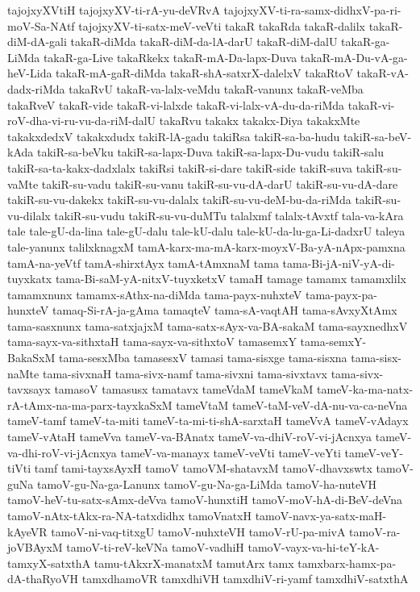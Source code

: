 {tajojxyXVtiH
tajojxyXV-ti-rA-yu-deVRvA
tajojxyXV-ti-ra-samx-didhxV-pa-ri-moV-Sa-NAtf
tajojxyXV-ti-satx-meV-veVti
takaR
takaRda
takaR-dalilx
takaR-diM-dA-gali
takaR-diMda
takaR-diM-da-lA-darU
takaR-diM-dalU
takaR-ga-LiMda
takaR-ga-Live
takaRkekx
takaR-mA-Da-lapx-Duva
takaR-mA-Du-vA-ga-heV-Lida
takaR-mA-gaR-diMda
takaR-shA-satxrX-dalelxV
takaRtoV
takaR-vA-dadx-riMda
takaRvU
takaR-va-lalx-veMdu
takaR-vanunx
takaR-veMba
takaRveV
takaR-vide
takaR-vi-lalxde
takaR-vi-lalx-vA-du-da-riMda
takaR-vi-roV-dha-vi-ru-vu-da-riM-dalU
takaRvu
takakx
takakx-Diya
takakxMte
takakxdedxV
takakxdudx
takiR-lA-gadu
takiRsa
takiR-sa-ba-hudu
takiR-sa-beV-kAda
takiR-sa-beVku
takiR-sa-lapx-Duva
takiR-sa-lapx-Du-vudu
takiR-salu
takiR-sa-ta-kakx-dadxlalx
takiRsi
takiR-si-dare
takiR-side
takiR-suva
takiR-su-vaMte
takiR-su-vadu
takiR-su-vanu
takiR-su-vu-dA-darU
takiR-su-vu-dA-dare
takiR-su-vu-dakekx
takiR-su-vu-dalalx
takiR-su-vu-deM-bu-da-riMda
takiR-su-vu-dilalx
takiR-su-vudu
takiR-su-vu-duMTu
talalxmf
talalx-tAvxtf
tala-va-kAra
tale
tale-gU-da-lina
tale-gU-dalu
tale-kU-dalu
tale-kU-da-lu-ga-Li-dadxrU
taleya
tale-yanunx
talilxknagxM
tamA-karx-ma-mA-karx-moyxV-Ba-yA-nApx-pamxna
tamA-na-yeVtf
tamA-shirxtAyx
tamA-tAmxnaM
tama
tama-Bi-jA-niV-yA-di-tuyxkatx
tama-Bi-saM-yA-nitxV-tuyxketxV
tamaH
tamage
tamamx
tamamxlilx
tamamxnunx
tamamx-sAthx-na-diMda
tama-payx-nuhxteV
tama-payx-pa-hunxteV
tamaq-Si-rA-ja-gAma
tamaqteV
tama-sA-vaqtAH
tama-sAvxyXtAmx
tama-sasxnunx
tama-satxjajxM
tama-satx-sAyx-va-BA-sakaM
tama-sayxnedhxV
tama-sayx-va-sithxtaH
tama-sayx-va-sithxtoV
tamasemxY
tama-semxY-BakaSxM
tama-sesxMba
tamasesxV
tamasi
tama-sisxge
tama-sisxna
tama-sisx-naMte
tama-sivxnaH
tama-sivx-namf
tama-sivxni
tama-sivxtavx
tama-sivx-tavxsayx
tamasoV
tamasusx
tamatavx
tameVdaM
tameVkaM
tameV-ka-ma-natx-rA-tAmx-na-ma-parx-tayxkaSxM
tameVtaM
tameV-taM-veV-dA-nu-va-ca-neVna
tameV-tamf
tameV-ta-miti
tameV-ta-mi-ti-shA-sarxtaH
tameVvA
tameV-vAdayx
tameV-vAtaH
tameVva
tameV-va-BAnatx
tameV-va-dhiV-roV-vi-jAcnxya
tameV-va-dhi-roV-vi-jAcnxya
tameV-va-manayx
tameV-veVti
tameV-veYti
tameV-veY-tiVti
tamf
tami-tayxsAyxH
tamoV
tamoVM-shatavxM
tamoV-dhavxswtx
tamoV-guNa
tamoV-gu-Na-ga-Lanunx
tamoV-gu-Na-ga-LiMda
tamoV-ha-nuteVH
tamoV-heV-tu-satx-sAmx-deVva
tamoV-hunxtiH
tamoV-moV-hA-di-BeV-deVna
tamoV-nAtx-tAkx-ra-NA-tatxdidhx
tamoVnatxH
tamoV-navx-ya-satx-maH-kAyeVR
tamoV-ni-vaq-titxgU
tamoV-nuhxteVH
tamoV-rU-pa-mivA
tamoV-ra-joVBAyxM
tamoV-ti-reV-keVNa
tamoV-vadhiH
tamoV-vayx-va-hi-teY-kA-tamxyX-satxthA
tamu-tAkxrX-manatxM
tamutArx
tamx
tamxbarx-hamx-pa-dA-thaRyoVH
tamxdhamoVR
tamxdhiVH
tamxdhiV-ri-yamf
tamxdhiV-satxthA
}
